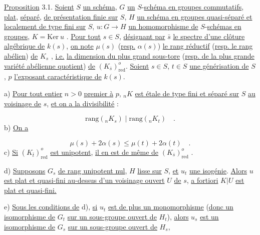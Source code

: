 \underline{Proposition} 3.1. \underline{Soient} $S$ \underline{un schéma}, $G$ \underline{un} $S$-\underline{schéma en groupes commutatifs}, \underline{plat}, \underline{séparé}, \underline{de présentation finie sur} $S$, $H$ \underline{un schéma en groupes quasi-séparé et localement de type fini sur} $S$, $u: G \longrightarrow H$ \underline{un homomorphisme de} $S$-\underline{schémas en groupes}, $K = \mathrm{Ker}\ u$ . \underline{Pour tout} $s \in S$, \underline{désignant par} $\bar{s}$ \underline{le spectre d'une clôture algébrique de} $k(s)$, \underline{on note} $\mu(s)$ (\underline{resp.} $\alpha(s)$) \underline{le rang réductif} (\underline{resp. le rang abélien}) \underline{de} $K_{s}$ , \underline{i.e.} \underline{la dimension du plus grand sous-tore} (\underline{resp. de la plus grande variété abélienne quotient}) \underline{de} $(K_{\bar{s}})^{o}_{\mathrm{red}}$. \underline{Soient} $s \in S$, $t \in S$ \underline{une générisation de} $S$, $p$ \underline{l'exposant caractéristique de} $k(s)$.

a) \underline{Pour tout entier} $n > 0$ \underline{premier à} $p$, ${}_{n}K$ \underline{est étale de type fini et séparé sur} $S$ \underline{au voisinage de} $s$, \underline{et on a la divisibilité} :

\begin{equation}\tag{3.1.1}
\mathrm{rang}({}_{n}K_{s}) \mid \mathrm{rang}({}_{n}K_{t}) \quad .
\end{equation}
b) \underline{On a}

\begin{equation}\tag{3.1.2}
\mu(s) + 2\alpha(s) \leq \mu(t) + 2\alpha(t) \quad .
\end{equation}
c) \underline{Si} $(K_{\bar{t}})^{o}_{\mathrm{red}}$ \underline{est unipotent}, \underline{il en est de même de} $(K_{\bar{s}})^{o}_{\mathrm{red}}$ .

d) \underline{Supposons} $G_{s}$ \underline{de rang unipotent nul}, $H$ \underline{lisse sur} $S$, \underline{et} $u_{t}$ \underline{une isogénie}. \underline{Alors} $u$ \underline{est plat et quasi-fini au-dessus d'un voisinage ouvert} $U$ \underline{de} $s$, \underline{a fortiori} $K|U$ \underline{est plat et quasi-fini.}

e) \underline{Sous les conditions de} d), \underline{si} $u_{t}$ \underline{est de plus un monomorphisme} (\underline{donc un isomorphisme de} $G_{t}$ \underline{sur un sous-groupe ouvert de} $H_{t}$), \underline{alors} $u_{s}$ \underline{est un isomorphisme de} $G_{s}$ \underline{sur un sous-groupe ouvert de} $H_{s}$,


